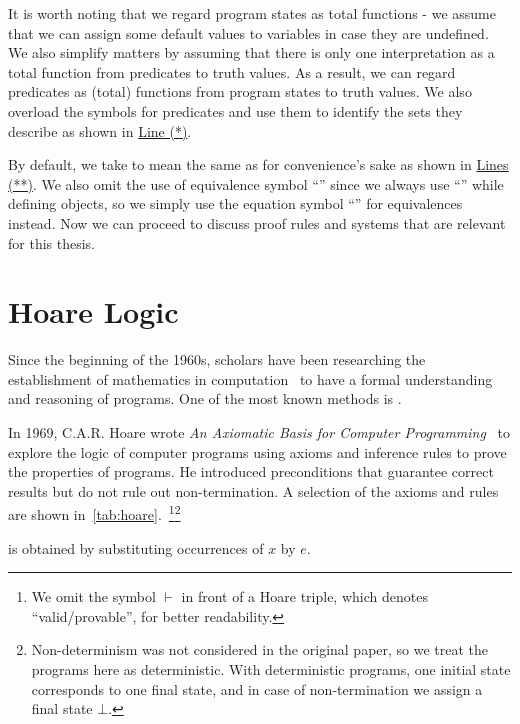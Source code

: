 It is worth noting that we regard program states as total functions - we assume that we can assign some default values to variables in case they are undefined. 
We also simplify matters by assuming that there is only one interpretation as a total function from predicates to truth values. 
As a result, we can regard predicates as (total) functions from program states to truth values. 
We also overload the symbols for predicates and use them to identify the sets they describe as shown in \hyperlink{(*)}{Line (*)}. 

By default, we take  to mean the same as  for convenience's sake as shown in \hyperlink{(**)}{Lines (**)}. 
We also omit the use of equivalence symbol ``\mathl{\equiv}'' since we always use ``\mathl{:=}'' while defining objects, so we simply use the equation symbol ``\mathl{=}'' for equivalences instead. 
Now we can proceed to discuss proof rules and systems that are relevant for this thesis. 




\section{Hoare Logic}
Since the beginning of the 1960s, scholars have been researching the establishment of mathematics in computation~\cite{floyd93, mccarthy93} to have a formal understanding and reasoning of programs. 
One of the most known methods is . 

In 1969, C.A.R. Hoare wrote \textit{An Axiomatic Basis for Computer Programming}~\cite{hoare69} to explore the logic of computer programs using axioms and inference rules to prove the properties of programs. 
He introduced  preconditions that  guarantee correct results but do not rule out non-termination. 
A selection of the axioms and rules are shown in~\autoref{tab:hoare}.~\footnote{We omit the symbol $\vdash$ in front of a Hoare triple, which denotes ``valid/provable'', for better readability. }\footnote{Non-determinism was not considered in the original paper, so we treat the programs here as deterministic. 
With deterministic programs, one initial state corresponds to one final state, and in case of non-termination we assign a final state $\bot$. }


 is obtained by substituting occurrences of $x$ by $e$. 

